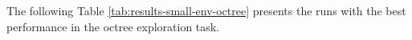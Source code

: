 
The following Table \ref{tab:results-small-env-octree} presents the runs with the best performance in the octree exploration task.
 
